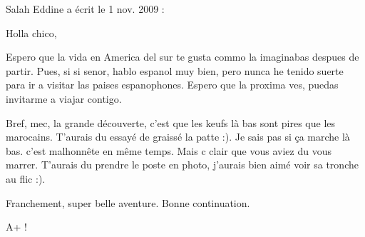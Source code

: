 \medskip
Salah Eddine a écrit le 1 nov. 2009 :
\begin{displayquote}
Holla chico,

Espero que la vida en America del sur te gusta commo la imaginabas despues de partir. Pues, si si senor, hablo espanol muy bien, pero nunca he tenido suerte para ir a visitar las paises espanophones. Espero que la proxima ves, puedas invitarme a viajar contigo.

Bref, mec, la grande découverte, c'est que les keufs là bas sont pires que les marocains. T'aurais du essayé de graissé la patte :). Je sais pas si ça marche là bas. c'est malhonnête en même temps. Mais c clair que vous aviez du vous marrer. T'aurais du prendre le poste en photo, j'aurais bien aimé voir sa tronche au flic :).

Franchement, super belle aventure. Bonne continuation.

A+ !
\end{displayquote}

\vfill
